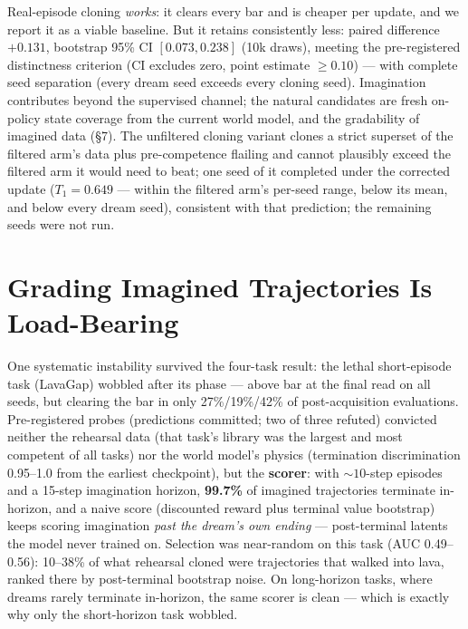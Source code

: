 \documentclass[10pt]{article}
\begin{document}
Real-episode cloning \emph{works}: it clears every bar and is cheaper per update, and we
report it as a viable baseline. But it retains consistently less: paired difference
$\mathbf{+0.131}$, bootstrap 95\% CI $\mathbf{[0.073, 0.238]}$ (10k draws), meeting the
pre-registered distinctness criterion (CI excludes zero, point estimate ${\geq}0.10$) ---
with complete seed separation (every dream seed exceeds every cloning seed). Imagination
contributes beyond the supervised channel; the natural candidates are fresh on-policy state
coverage from the current world model, and the gradability of imagined data (\S7). The
unfiltered cloning variant clones a strict superset of the filtered arm's data plus
pre-competence flailing and cannot plausibly exceed the filtered arm it would need to beat;
one seed of it completed under the corrected update ($T_1 = 0.649$ --- within the filtered
arm's per-seed range, below its mean, and below every dream seed), consistent with that
prediction; the remaining seeds were not run.

\section{Grading Imagined Trajectories Is Load-Bearing}

One systematic instability survived the four-task result: the lethal short-episode task
(LavaGap) wobbled after its phase --- above bar at the final read on all seeds, but clearing
the bar in only 27\%/19\%/42\% of post-acquisition evaluations. Pre-registered probes
(predictions committed; two of three refuted) convicted neither the rehearsal data (that
task's library was the largest and most competent of all tasks) nor the world model's
physics (termination discrimination 0.95--1.0 from the earliest checkpoint), but the
\textbf{scorer}: with ${\sim}10$-step episodes and a 15-step imagination horizon,
\textbf{99.7\%} of imagined trajectories terminate in-horizon, and a naive score (discounted
reward plus terminal value bootstrap) keeps scoring imagination \emph{past the dream's own
ending} --- post-terminal latents the model never trained on. Selection was near-random on
this task (AUC 0.49--0.56): 10--38\% of what rehearsal cloned were trajectories that walked
into lava, ranked there by post-terminal bootstrap noise. On long-horizon tasks, where
dreams rarely terminate in-horizon, the same scorer is clean --- which is exactly why only
the short-horizon task wobbled.
\end{document}
